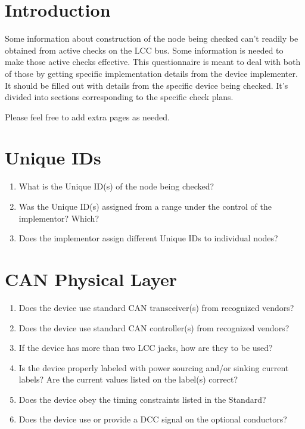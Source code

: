 



\maketitle
\thispagestyle{firststyle}

\section{Introduction}

Some information about construction of the node being checked can't readily be obtained
from active checks on the LCC bus. Some information is needed to make those active 
checks effective.  This questionnaire is meant to deal with both of those
by getting specific implementation details from the device implementer.
It should be filled out with details from the specific device being checked.
It's divided into sections corresponding to the specific check plans.

Please feel free to add extra pages as needed.

\section{Unique IDs}
\begin{enumerate}
    \item What is the Unique ID(s) of the node being checked?
    \item Was the Unique ID(s) assigned from a range under the control of the implementor? Which?
    \item Does the implementor assign different Unique IDs to individual nodes?
\end{enumerate}

\section{CAN Physical Layer}
\begin{enumerate}
    \item Does the device use standard CAN transceiver(s) from recognized vendors?
    \item Does the device use standard CAN controller(s) from recognized vendors?
    \item If the device has more than two LCC jacks, how are they to be used?
    \item Is the device properly labeled with power sourcing and/or sinking current labels?
        Are the current values listed on the label(s) correct?
    \item Does the device obey the timing constraints listed in the Standard?
    \item Does the device use or provide a DCC signal on the optional conductors?
\end{enumerate}

